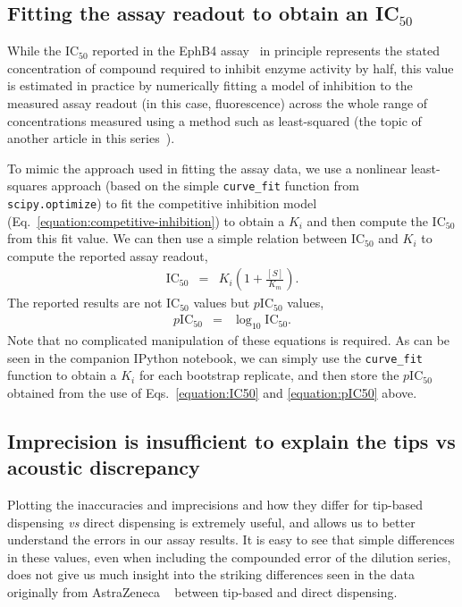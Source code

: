 \documentclass[aps,pre,twocolumn,nofootinbib,superscriptaddress,linenumbers]{revtex4-1}
\begin{document}
\subsection*{Fitting the assay readout to obtain an IC$_{50}$}

While the IC$_{50}$ reported in the EphB4 assay~\cite{ekins_dispensing_2013,barlaam_novel_2009,barlaam_pyrimidine_2010} in principle represents the stated concentration of compound required to inhibit enzyme activity by half, this value is estimated in practice by numerically fitting a model of inhibition to the measured assay readout (in this case, fluorescence) across the whole range of concentrations measured using a method such as least-squared (the topic of another article in this series~\cite{jones_fitting_2015}).

To mimic the approach used in fitting the assay data, we use a nonlinear least-squares approach (based on the simple {\tt curve\_fit} function from {\tt scipy.optimize}) to fit the competitive inhibition model (Eq.~\ref{equation:competitive-inhibition}) to obtain a $K_i$ and then compute the IC$_{50}$ from this fit value.
We can then use a simple relation between IC$_{50}$ and $K_{i}$ to compute the reported assay readout,
\begin{eqnarray}
\mathrm{IC}_{50} &=& K_{i}\left(1+\frac{[S]}{K_{m}}\right) \label{equation:IC50} .
\end{eqnarray} 
The reported results are not IC$_{50}$ values but $p$IC$_{50}$ values, 
\begin{eqnarray}
p\mathrm{IC}_{50} &=& \log_{10} \mathrm{IC}_{50} \label{equation:pIC50} .
\end{eqnarray}
Note that no complicated manipulation of these equations is required.
As can be seen in the companion IPython notebook, we can simply use the {\tt curve\_fit} function to obtain a $K_i$ for each bootstrap replicate, and then store the $p$IC$_{50}$ obtained from the use of Eqs.~\ref{equation:IC50} and \ref{equation:pIC50} above.

\subsection*{Imprecision is insufficient to explain the tips vs acoustic discrepancy}

Plotting the inaccuracies and imprecisions and how they differ for tip-based dispensing \emph{vs} direct dispensing is extremely useful, and allows us to better understand the errors in our assay results. 
It is easy to see that simple differences in these values, even when including the compounded error of the dilution series, does not give us much insight into the striking differences seen in the data originally from AstraZeneca ~\cite{ekins_dispensing_2013,barlaam_novel_2009,barlaam_pyrimidine_2010} between tip-based and direct dispensing.
\end{document}
